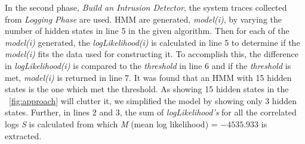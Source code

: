 \begin{table}
\centering
\caption{Slice of a faulty system trace obtained while an UAV was flying on a random route and infected by distance spoofing attack}
\label{tab:faultyCorrelationLog}
\end{table}
In the second phase, \textit{Build an Intrusion Detector}, the system traces collected from \textit{Logging Phase} are used. \ac{HMM} are generated, \textit{model(i)}, by varying the number of hidden states in line 5 in the given algorithm. Then for each of the \textit{model(i)} generated, the \textit{logLikelihood(i)} is calculated in line 5 to determine if the \textit{model(i)} fits the data used for constructing it. To accomplish this, the difference in \textit{logLikelihood(i)} is compared to the \textit{threshold} in line 6 and if the \textit{threshold} is met, \textit{model(i)} is returned in line 7. It was found that an \ac{HMM} with 15 hidden states is the one which met the threshold. As showing 15 hidden states in the ~\autoref{fig:approach} will clutter it, we simplified the model by showing only 3 hidden states. Further, in lines 2 and 3, the sum of \textit{logLikelihood's} for all the correlated logs \textit{S} is calculated from which \textit{M} (mean log likelihood) = $-4535.933$ is extracted.

